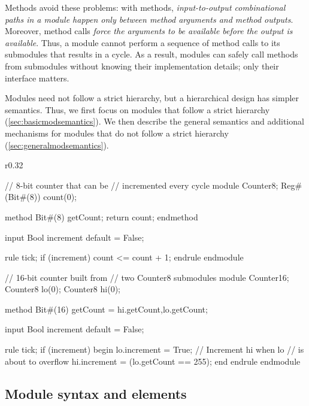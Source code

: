 Methods avoid these problems: with methods,
\emph{input-to-output combinational paths in a module happen only between method arguments and method outputs}.
Moreover, method calls \emph{force the arguments to be available before the output is available}.
Thus, a module cannot perform a sequence of method calls to its submodules that results in a cycle.
As a result, modules can safely call methods from submodules without knowing their implementation details;
only their interface matters.

Modules need not follow a strict hierarchy, but a hierarchical design has simpler semantics.
Thus, we first focus on modules that follow a strict hierarchy (\autoref{sec:basicmodsemantics}). %
We then describe the general semantics and additional mechanisms for modules that do not follow a strict hierarchy (\autoref{sec:generalmodsemantics}).

\begin{wrapfigure}{r}{0.32\columnwidth}
\vspace{-4em}
\begin{mscode}
// 8-bit counter that can be
// incremented every cycle
module Counter8;
  Reg#(Bit#(8)) count(0);

  method Bit#(8) getCount;
    return count;
  endmethod

  input Bool increment
    default = False;

  rule tick;
    if (increment)
      count <= count + 1;
  endrule
endmodule

// 16-bit counter built from 
// two Counter8 submodules
module Counter16;
  Counter8 lo(0);
  Counter8 hi(0);

  method Bit#(16) getCount =
   {hi.getCount,lo.getCount};

  input Bool increment
    default = False;

  rule tick;
    if (increment) begin
      lo.increment = True;
      // Increment hi when lo
      // is about to overflow
      hi.increment =
       (lo.getCount == 255);
    end
  endrule
endmodule
\end{mscode}
\vspace{-9em}
\end{wrapfigure}

\subsection{Module syntax and elements}
\label{sec:modulesyntax}
\label{sec:submodules}

